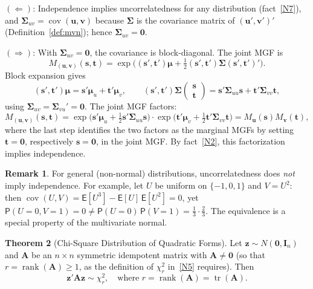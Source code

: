 \documentclass[12pt,a4paper]{article}
\makeatletter
\theoremstyle{definition}
\newtheorem{theorem}{Theorem}[section]
\newtheorem{remark}[theorem]{Remark}
\renewenvironment{proof}[1][\proofname]{\par
  \pushQED{\qed}%
  \normalfont \topsep6\p@\@plus6\p@\relax
  \trivlist
  \item[\hskip\labelsep\bfseries #1\@addpunct{.}]\ignorespaces
}{%
  \popQED\endtrivlist\@endpefalse
}
\newcommand\expc{\mathsf{E}}
\newcommand\prb{\mathsf{P}}
\DeclareMathOperator\cov{cov}
\DeclareMathOperator\tr{tr}
\DeclareMathOperator\rank{rank}
\newcommand{\bI}{\mathbf{I}}
\newcommand{\bzero}{\mathbf{0}}
\newcommand{\bz}{\mathbf{z}}
\newcommand{\bA}{\mathbf{A}}
\newcommand{\bv}{\mathbf{v}}
\newcommand{\bu}{\mathbf{u}}
\makeatother
\begin{document}
\begin{proof}
$(\Leftarrow)$: Independence implies uncorrelatedness for any distribution (fact~\ref{N7}), and $\boldsymbol\Sigma_{uv} = \cov(\bu, \bv)$ because $\boldsymbol\Sigma$ is the covariance matrix of $(\bu', \bv')'$ (Definition~\ref{def:mvn}); hence $\boldsymbol\Sigma_{uv} = \bzero$.

$(\Rightarrow)$: With $\boldsymbol\Sigma_{uv} = \bzero$, the covariance is block-diagonal. The joint MGF is
\[
M_{(\bu,\bv)}(\mathbf{s}, \mathbf{t}) = \exp\bigl((\mathbf{s}', \mathbf{t}')\boldsymbol\mu + \tfrac{1}{2}(\mathbf{s}', \mathbf{t}')\boldsymbol\Sigma(\mathbf{s}', \mathbf{t}')'\bigr).
\]
Block expansion gives
\[
(\mathbf{s}', \mathbf{t}')\boldsymbol\mu = \mathbf{s}'\boldsymbol\mu_u + \mathbf{t}'\boldsymbol\mu_v, \qquad (\mathbf{s}', \mathbf{t}')\boldsymbol\Sigma\begin{pmatrix}\mathbf{s}\\\mathbf{t}\end{pmatrix} = \mathbf{s}'\boldsymbol\Sigma_{uu}\mathbf{s} + \mathbf{t}'\boldsymbol\Sigma_{vv}\mathbf{t},
\]
using $\boldsymbol\Sigma_{uv} = \boldsymbol\Sigma_{vu}' = \bzero$. The joint MGF factors:
\[
M_{(\bu,\bv)}(\mathbf{s}, \mathbf{t}) = \exp\bigl(\mathbf{s}'\boldsymbol\mu_u + \tfrac{1}{2}\mathbf{s}'\boldsymbol\Sigma_{uu}\mathbf{s}\bigr) \cdot \exp\bigl(\mathbf{t}'\boldsymbol\mu_v + \tfrac{1}{2}\mathbf{t}'\boldsymbol\Sigma_{vv}\mathbf{t}\bigr) = M_{\bu}(\mathbf{s}) M_{\bv}(\mathbf{t}),
\]
where the last step identifies the two factors as the marginal MGFs by setting $\mathbf{t} = \bzero$, respectively $\mathbf{s} = \bzero$, in the joint MGF. By fact~\ref{N2}, this factorization implies independence.
\end{proof}

\begin{remark}\label{rem:uncorr-indep}
For general (non-normal) distributions, uncorrelatedness does \emph{not} imply independence. For example, let $U$ be uniform on $\{-1, 0, 1\}$ and $V = U^2$: then $\cov(U, V) = \expc[U^3] - \expc[U]\,\expc[U^2] = 0$, yet $\prb(U = 0, V = 1) = 0 \neq \prb(U = 0)\,\prb(V = 1) = \tfrac{1}{3}\cdot\tfrac{2}{3}$. The equivalence is a special property of the multivariate normal.
\end{remark}

\begin{theorem}[Chi-Square Distribution of Quadratic Forms]\label{thm:quadratic-chisq}
Let $\bz \sim N(\bzero, \bI_n)$ and $\bA$ be an $n \times n$ symmetric idempotent matrix with $\bA \neq \bzero$ (so that $r = \rank(\bA) \geqslant 1$, as the definition of $\chi^2_r$ in~\ref{N5} requires). Then
\begin{equation}
\bz'\bA\bz \sim \chi^2_r, \quad \text{where } r = \rank(\bA) = \tr(\bA).
\end{equation}
\end{theorem}
\end{document}
